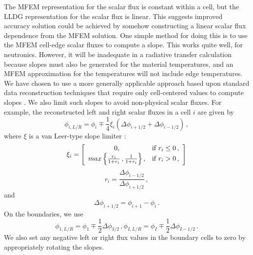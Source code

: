 The MFEM representation for the scalar flux is constant within a cell, but the LLDG representation for the scalar flux is linear.  This suggests improved 
accuracy \SN solution could be achieved by somehow constructing a linear scalar flux dependence from the MFEM solution.  One simple method for doing 
this is to use the MFEM cell-edge scalar fluxes to compute a slope.  This works quite well, for neutronics.  However, it will be inadequate in a radiative 
transfer calculation because slopes must also be generated for the material temperatures, and an MFEM approximation for the temperatures will not include 
edge temperatures.  We have chosen to use a more generally applicable approach based upon standard data reconstruction techniques 
that require only cell-centered values to compute slopes \cite{vanLeer}.  We also limit such slopes to avoid non-physical scalar fluxes.  For example, the reconstructed left and right scalar fluxes in a cell $i$ are given by 
	\begin{equation} \label{consistent:reconstruction}
		\phi_{i,L/R} = \phi_i \mp \frac{1}{4} \xi_i \left(\Delta \phi_{i+1/2} + \Delta \phi_{i-1/2}\right) \,,
	\end{equation}
where $\xi$ is a van Leer-type slope limiter \cite{vanLeer}:
\begin{equation}
\xi_i = \left[ 
\begin{array} {cl}
0, & \mbox{if  $r_i \le 0$}\,,\\
max\left\{ \frac{r_i}{1+r_i}\,,\frac{1}{1+r_i} \right\}, & \mbox{if $r_i > 0$}\,,
\end{array}
 \right]
\end{equation}
\begin{equation}
r_i = \frac{\Delta \phi_{i-1/2}}{\Delta \phi_{i+1/2}} \, ,
\end{equation}
and
\begin{equation}
\Delta \phi_{i+1/2}=\phi_{i+1}-\phi_{i} \, .
\end{equation}
On the boundaries, we use 
	\begin{subequations}
		\begin{equation}
			\phi_{1,L/R} = \phi_1 \mp \frac{1}{2} \Delta \phi_{3/2} \,,
		\end{equation}
		\begin{equation}
			\phi_{I,L/R} = \phi_I \mp \frac{1}{2} \Delta \phi_{I-1/2} \,.
		\end{equation}
	\end{subequations}
We also set any negative left or right flux values in the boundary cells to zero by appropriately rotating the slopes.
